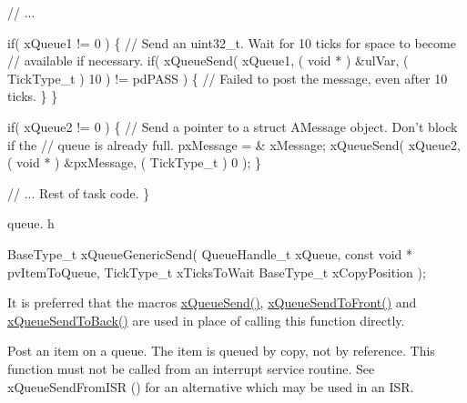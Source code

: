 \begin{DoxyPre}   // ...\end{DoxyPre}



\begin{DoxyPre}   if( xQueue1 != 0 )
   \{
    // Send an uint32\_t.  Wait for 10 ticks for space to become
    // available if necessary.
    if( xQueueSend( xQueue1, ( void * ) \&ulVar, ( TickType\_t ) 10 ) != pdPASS )
    \{
        // Failed to post the message, even after 10 ticks.
    \}
   \}\end{DoxyPre}



\begin{DoxyPre}   if( xQueue2 != 0 )
   \{
    // Send a pointer to a struct AMessage object.  Don't block if the
    // queue is already full.
    pxMessage = \& xMessage;
    xQueueSend( xQueue2, ( void * ) \&pxMessage, ( TickType\_t ) 0 );
   \}\end{DoxyPre}



\begin{DoxyPre}   // ... Rest of task code.
\}
\end{DoxyPre}


queue. h 
\begin{DoxyPre}
BaseType\_t xQueueGenericSend(
                                QueueHandle\_t xQueue,
                                const void * pvItemToQueue,
                                TickType\_t xTicksToWait
                                BaseType\_t xCopyPosition
                            );
  \end{DoxyPre}


It is preferred that the macros \mbox{\hyperlink{queue_8h_af7eb49d3249351176992950d9185abe9}{x\+Queue\+Send()}}, \mbox{\hyperlink{queue_8h_aa612fcc2b1ceee0200f34b942e300b41}{x\+Queue\+Send\+To\+Front()}} and \mbox{\hyperlink{queue_8h_a81d24a2c1199d58efb76fbee15853112}{x\+Queue\+Send\+To\+Back()}} are used in place of calling this function directly.

Post an item on a queue. The item is queued by copy, not by reference. This function must not be called from an interrupt service routine. See x\+Queue\+Send\+From\+I\+SR () for an alternative which may be used in an I\+SR.


